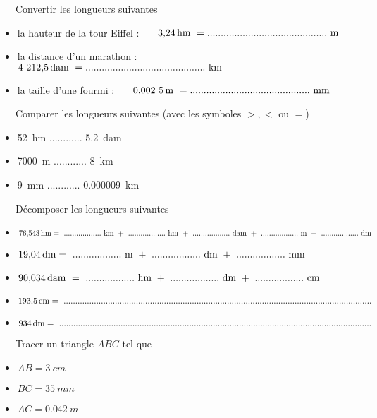 \documentclass[12pt]{memoir}
\begin{document}
\begin{questions}
\setlength\itemsep{2em}

\exercice ~~~Convertir les longueurs suivantes\\
\begin{itemize}
\setlength\itemsep{1em}
    \item la hauteur de la tour Eiffel : ~~~$\qty{3,24}{hm}~= \dotsss~\unit{m}$ 
    \item la distance d'un marathon : ~~~$\qty{4212,5}{dam}~= \dotsss~\unit{km}$
    \item la taille d'une fourmi : ~~~$\qty{0,0025}{m}~= \dotsss~\unit{mm}$
\end{itemize}

\exercice ~~~Comparer les longueurs suivantes (avec les symboles $>, <$ ou $=$)\\
\begin{itemize}
\setlength\itemsep{1em}
    \item \qty{52}{hm} ............ \qty{5,2}{dam}
    \item \qty{7000}{m} ............ \qty{8}{km}
    \item \qty{9}{mm} ............ \qty{0,000 009}{km}
\end{itemize}

\exercice ~~~Décomposer les longueurs suivantes\\
\begin{itemize}
\setlength\itemsep{1em}
    \item $\qty{76,543}{hm} =~\dotss~\unit{km}~+~\dotss~\unit{hm}~+~\dotss~\unit{dam}~+~\dotss~\unit{m}~+~\dotss~\unit{dm}$
    \item $\qty{19,04}{dm} =~\dotss~\unit{m}~+~\dotss~\unit{dm}~+~\dotss~\unit{mm}$
    \item $\qty{90,034}{dam}~=~\dotss~\unit{hm}~+~\dotss~\unit{dm}~+~\dotss~\unit{cm}$
    \item $\qty{193,5}{cm} =~....................................................................................................................................$
    \item $\qty{934}{dm} =~....................................................................................................................................$
\end{itemize}

\exercice ~~~Tracer un triangle $ABC$ tel que\\
\begin{itemize}
\setlength\itemsep{1em}
    \item $AB = \qty{3}{cm}$
    \item $BC = \qty{35}{mm}$
    \item $AC = \qty{0,042}{m}$
\end{itemize}

\end{questions}
\end{document}
